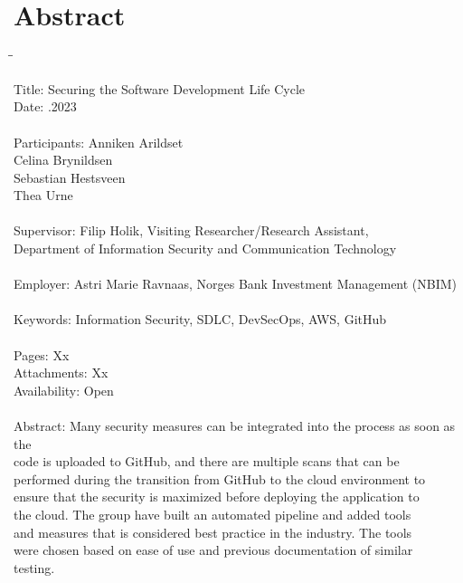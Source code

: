 
\chapter*{Abstract}

\begin{tabbing}
\hspace{2cm}\=\hspace{3cm}\=\kill %

Title: \> \> Securing the Software Development Life Cycle \\
Date: \> .2023 \\ 
\\
Participants: \> \> Anniken Arildset \\ \> \> Celina Brynildsen \\ \> \> Sebastian Hestsveen \\ \> \> Thea Urne \\
\\
Supervisor: \> \> Filip Holik, Visiting Researcher/Research Assistant, \\\> \> Department of Information Security and Communication Technology \\
\\
Employer: \> \>  Astri Marie Ravnaas, Norges Bank Investment Management (NBIM) \\
\\
Keywords: \> \> Information Security, SDLC, DevSecOps, AWS, GitHub \\
\\
Pages: \> \> Xx \\
Attachments: \> \> Xx \\
Availability: \> \> Open \\
\\
Abstract: \> \> Many security measures can be integrated into the process as soon as the \\ \> \> code is uploaded to GitHub, and  there are multiple scans that can be\\ \> \> performed during the transition from GitHub to the cloud environment to\\ \> \> ensure that the security is maximized before deploying the application to \\ \> \>the cloud. The group have built an automated pipeline and added tools\\ \> \>and measures that is considered best practice in the industry. The tools\\ \> \> were chosen based on ease of use and previous documentation of similar\\ \> \> testing. 



\end{tabbing}
